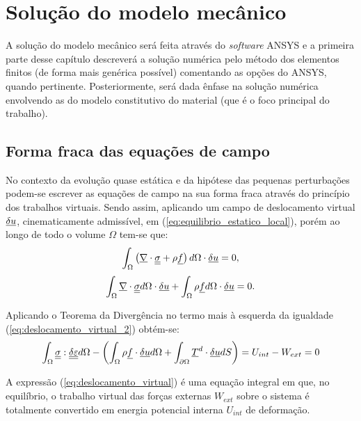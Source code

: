 \chapter{Solução do modelo mecânico}
A solução do modelo mecânico será feita através do \textit{software} ANSYS e a primeira parte desse capítulo descreverá a solução numérica pelo método dos elementos finitos (de forma mais genérica possível) comentando as opções do ANSYS, quando pertinente. Posteriormente, será dada ênfase na solução numérica envolvendo as do modelo constitutivo do material (que é o foco principal do trabalho). 

\section{Forma fraca das equações de campo}
No contexto da evolução quase estática e da hipótese das pequenas perturbações podem-se escrever as equações de campo na sua forma fraca através do princípio dos trabalhos virtuais. Sendo assim, aplicando um campo de deslocamento virtual $\underline {\delta u}$, cinematicamente admissível, em (\ref{eq:equilibrio_estatico_local}), porém ao longo de todo o volume $\Omega$ tem-se que:
\begin{equation}
	\label{eq:deslocamento_virtual}
	\int_{\Omega} \left(\underline \nabla \cdot \underline{\underline \sigma} + \rho \underline f \right)d\Omega \cdot \underline {\delta u} = 0,
\end{equation}
\begin{equation}
	\label{eq:deslocamento_virtual_2}
	\int_{\Omega} \underline \nabla \cdot \underline{\underline \sigma} d\Omega \cdot \underline {\delta u} + \int_{\Omega} \rho \underline f d\Omega \cdot \underline {\delta u} = 0.
\end{equation}

Aplicando o Teorema da Divergência no termo mais à esquerda da igualdade (\ref{eq:deslocamento_virtual_2}) obtém-se:
\begin{equation}
	\label{eq:deslocamento_virtual_3}
	\int_{\Omega} \underline{\underline \sigma} : \underline{\underline {\delta \varepsilon}} d\Omega - \left(\int_{\Omega} \rho \underline f \cdot \underline {\delta u} d\Omega + \int_{\partial \Omega} \underline T^d \cdot \underline {\delta u} dS \right) = U_{int} - W_{ext} = 0
\end{equation}

A expressão (\ref{eq:deslocamento_virtual}) é uma equação integral em que, no equilíbrio, o trabalho virtual das forças externas $W_{ext}$ sobre o sistema é totalmente convertido em energia potencial interna $U_{int}$  de deformação.

